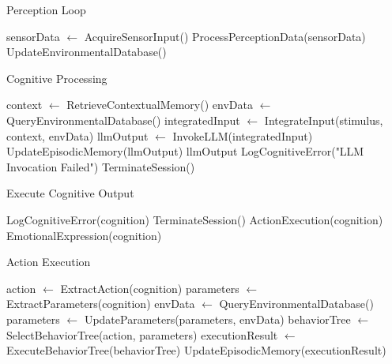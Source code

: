 \documentclass[pdflatex,sn-mathphys-num]{sn-jnl}%
\theoremstyle{thmstyleone}%
\theoremstyle{thmstyletwo}%
\theoremstyle{thmstylethree}%
\begin{document}
\begin{algorithm}
\caption{Perception Loop}\label{algo_perception_loop}
\begin{algorithmic}[1]
        \State sensorData $\gets$ AcquireSensorInput()
        \State ProcessPerceptionData(sensorData)
        \State UpdateEnvironmentalDatabase()
    \EndWhile
\EndProcedure
\end{algorithmic}
\end{algorithm}

\begin{algorithm}
\caption{Cognitive Processing}\label{algo_cognitive_processing}
\begin{algorithmic}[1]
    \State context $\gets$ RetrieveContextualMemory()
    \State envData $\gets$ QueryEnvironmentalDatabase()
    \State integratedInput $\gets$ IntegrateInput(stimulus, context, envData)
    \State llmOutput $\gets$ InvokeLLM(integratedInput)
        \State UpdateEpisodicMemory(llmOutput)
        \State \Return llmOutput
    \Else
        \State LogCognitiveError("LLM Invocation Failed")
        \State TerminateSession()
    \EndIf
\EndProcedure
\end{algorithmic}
\end{algorithm}



\begin{algorithm}
\caption{Execute Cognitive Output}\label{algo_execute_cognitive_output}
\begin{algorithmic}[1]
        \State LogCognitiveError(cognition)
        \State TerminateSession()
    \Else
        \Parallel
            \State ActionExecution(cognition)
            \State EmotionalExpression(cognition)
        \EndParallel
    \EndIf
\EndProcedure
\end{algorithmic}
\end{algorithm}



\begin{algorithm}
\caption{Action Execution}\label{algo_action_execution}
\begin{algorithmic}[1]
    \State action $\gets$ ExtractAction(cognition)
    \State parameters $\gets$ ExtractParameters(cognition)
        \State envData $\gets$ QueryEnvironmentalDatabase()
        \State parameters $\gets$ UpdateParameters(parameters, envData)
    \EndIf
    \State behaviorTree $\gets$ SelectBehaviorTree(action, parameters)
    \State executionResult $\gets$ ExecuteBehaviorTree(behaviorTree)
    \State UpdateEpisodicMemory(executionResult)
\EndProcedure
\end{algorithmic}
\end{algorithm}
\end{document}

